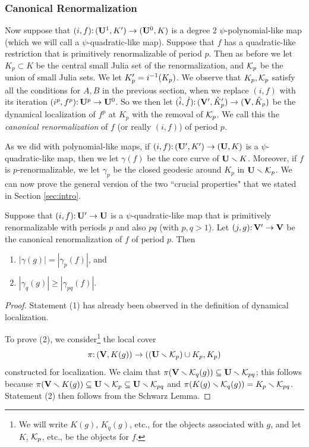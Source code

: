 \subsubsection{Canonical Renormalization}
Now suppose that $(i, f)\mathpunct: (\mathbf U^1, K') \to (\mathbf U^0, K)$ is a degree 2 $\psi$-polynomial-like map (which we will call a $\psi$-quadratic-like map).
Suppose that $f$ has a quadratic-like restriction that is primitively renormalizable of period $p$.
Then as before we let $K_p \subset K$ be the central small Julia set of the renormalization,
and ${\mathcal K}_p$ be the union of small Julia sets.
We let $K_p' = i^{-1}(K_p)$. 
We observe that $K_p, {\mathcal K}_p$ satisfy all the conditions for $A, B$ in the previous section,
when we replace $(i, f)$ with its iteration $(i^p, f^p)\mathpunct: \mathbf U^p \to \mathbf U^0$. 
So we then let $(\hat i, \hat f)\mathpunct: ({\mathbf{V}}', \hat K_p') \to ({\mathbf{V}}, \hat K_p)$ be the dynamical localization of $f^p$ at $K_p$ with the removal of ${\mathcal K}_p$. 
We call this the \emph{canonical renormalization} of $f$ (or really $(i, f)$) of period $p$. 

As we did with polynomial-like maps,
if $(i, f)\mathpunct: (\mathbf U', K') \to (\mathbf U, K)$ is a $\psi$-quadratic-like map,
then we let $\gamma(f)$ be the core curve of $\mathbf U \smallsetminus K$.
Moreover, 
if $f$ is $p$-renormalizable,
we let $\gamma_p$ be the closed geodesic around $K_p$ in $\mathbf U \smallsetminus {\mathcal K}_p$. 
We can now prove the general version of the two ``crucial properties" that we stated in Section \ref{sec:intro}.
\begin{theorem} \label{thm:iterated-lengths}
Suppose that $(i, f)\mathpunct: \mathbf U' \to \mathbf U$ is a $\psi$-quadratic-like map that is primitively renormalizable with periods $p$ and also $pq$ (with $p, q > 1$).
Let $(j, g)\mathpunct: {\mathbf{V}}' \to {\mathbf{V}}$ be the canonical renormalization of $f$ of period $p$.
Then 
\begin{enumerate}
\item
$|\gamma(g)| = |\gamma_p(f)|$, and 
\item
$|\gamma_q(g)| \ge |\gamma_{pq}(f)|$.
\end{enumerate}
\end{theorem}
\begin{proof}
Statement (1) has already been observed in the definition of dynamical localization. 


To prove (2),
we consider\footnote{We will write $K(g)$, $K_q(g)$, etc., for the objects associated with $g$, and let $K$, ${\mathcal K}_p$, etc., be the objects for $f$.}
 the local cover 
$$\pi\mathpunct: ({\mathbf{V}}, K(g)) \to ((\mathbf U \smallsetminus {\mathcal K}_p) \cup K_p, K_p)$$
constructed for localization. 
We claim that $\pi({\mathbf{V}}\smallsetminus {\mathcal K}_q(g)) \subseteq \mathbf U \smallsetminus {\mathcal K}_{pq}$;
this follows because $\pi({\mathbf{V}} \smallsetminus K(g)) \subseteq \mathbf U \smallsetminus {\mathcal K}_p \subseteq \mathbf U \smallsetminus {\mathcal K}_{pq}$
and $\pi(K(g) \smallsetminus {\mathcal K}_q(g)) = K_p \smallsetminus {\mathcal K}_{pq}$. 
Statement (2) then follows from the Schwarz Lemma.
\end{proof}

